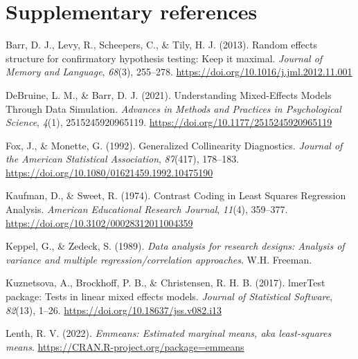\documentclass[
  bookmarksnumbered]{article}
\newlength{\cslhangindent}
\newlength{\cslentryspacingunit} %
\newenvironment{CSLReferences}[2] %
 {%
  \setlength{\parindent}{0pt}
  \ifodd #1
  \let\oldpar\par
  \def\par{\hangindent=\cslhangindent\oldpar}
  \fi
  \setlength{\parskip}{#2\cslentryspacingunit}
 }%
 {}
\begin{document}
\newpage

\hypertarget{refs}{%
\section*{Supplementary references}\label{refs}}

\hypertarget{refs}{}
\begin{CSLReferences}{1}{0}
\leavevmode{}%
Barr, D. J., Levy, R., Scheepers, C., \& Tily, H. J. (2013). Random effects structure for confirmatory hypothesis testing: {Keep} it maximal. \emph{Journal of Memory and Language}, \emph{68}(3), 255--278. \url{https://doi.org/10.1016/j.jml.2012.11.001}

\leavevmode{}%
DeBruine, L. M., \& Barr, D. J. (2021). Understanding {Mixed-Effects Models Through Data Simulation}. \emph{Advances in Methods and Practices in Psychological Science}, \emph{4}(1), 2515245920965119. \url{https://doi.org/10.1177/2515245920965119}

\leavevmode{}%
Fox, J., \& Monette, G. (1992). Generalized {Collinearity Diagnostics}. \emph{Journal of the American Statistical Association}, \emph{87}(417), 178--183. \url{https://doi.org/10.1080/01621459.1992.10475190}

\leavevmode{}%
Kaufman, D., \& Sweet, R. (1974). Contrast {Coding} in {Least Squares Regression Analysis}. \emph{American Educational Research Journal}, \emph{11}(4), 359--377. \url{https://doi.org/10.3102/00028312011004359}

\leavevmode{}%
Keppel, G., \& Zedeck, S. (1989). \emph{Data analysis for research designs: {Analysis} of variance and multiple regression/correlation approaches}. {W.H. Freeman}.

\leavevmode{}%
Kuznetsova, A., Brockhoff, P. B., \& Christensen, R. H. B. (2017). {lmerTest} package: Tests in linear mixed effects models. \emph{Journal of Statistical Software}, \emph{82}(13), 1--26. \url{https://doi.org/10.18637/jss.v082.i13}

\leavevmode{}%
Lenth, R. V. (2022). \emph{Emmeans: Estimated marginal means, aka least-squares means}. \url{https://CRAN.R-project.org/package=emmeans}


\end{CSLReferences}
\end{document}
